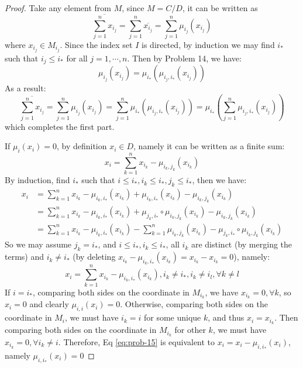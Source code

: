 \documentclass{solution}
\begin{document}
\begin{proof}
    Take any element from $M$, since $M = C/D$, it can be written as
    $$\overline{\sum\limits_{j = 1}^{n} x_{i_j}} = \sum\limits_{j = 1}^{n} \overline{x_{i_j}} = \sum\limits_{j = 1}^{n} \mu_{i_j}(x_{i_j})$$
    where $x_{i_j} \in M_{i_j}$. Since the index set $I$ is directed, by induction we may find $i_{*}$ such that $i_{j} \le i_*$ for all $j = 1, \cdots, n$. Then by Problem 14, we have:
    $$\mu_{i_j}(x_{i_j}) = \mu_{i_*}(\mu_{i_j, i_*}(x_{i_j}))$$
    As a result:
    $$\overline{\sum\limits_{j = 1}^{n} x_{i_j}} = \sum\limits_{j = 1}^{n} \mu_{i_j}(x_{i_j}) = \sum\limits_{j = 1}^{n} \mu_{i_*}(\mu_{i_j, i_*}(x_{i_j})) = \mu_{i_*} \left(\sum\limits_{j = 1}^{n} \mu_{i_j, i_*}(x_{i_j})\right)$$
    which completes the first part.

    If $\mu_i(x_i) = 0$, by definition $x_i \in D$, namely it can be written as a finite sum:
    $$x_i = \sum\limits_{k = 1}^{n} x_{i_k} - \mu_{i_k, j_k}(x_{i_k})$$
    By induction, find $i_*$ such that $i \le i_*, i_k \le i_*, j_k \le i_*$, then we have:
    $$
        \begin{aligned}
        x_i &= \sum\limits_{k = 1}^{n} x_{i_k} - \mu_{i_k, i_*}(x_{i_k}) + \mu_{i_k, i_*}(x_{i_k}) - \mu_{i_k, j_k}(x_{i_k}) \\
        &= \sum\limits_{k = 1}^{n} x_{i_k} - \mu_{i_k, i_*}(x_{i_k}) + \mu_{j_k, i_*} \circ \mu_{i_k, j_k} (x_{i_k}) - \mu_{i_k, j_k}(x_{i_k})\\
        &= \sum\limits_{k = 1}^{n} x_{i_k} - \mu_{i_k, i_*}(x_{i_k}) - \sum\limits_{k = 1}^{n} \mu_{i_k, j_k}(x_{i_k}) - \mu_{j_k, i_*} \circ \mu_{i_k, j_k} (x_{i_k})
        \end{aligned}
    $$
    So we may assume $j_k = i_*$, and $i \le i_*, i_k \le i_*$, all $i_k$ are distinct (by merging the terms) and $i_k \ne i_*$ (by deleting $x_{i_k} - \mu_{i_k, i_*}(x_{i_k}) = x_{i_k} - x_{i_k} = 0$), namely:
    \begin{equation}\label{eq:prob-15}
        x_i = \sum\limits_{k = 1}^{n} x_{i_k} - \mu_{i_k, i_*}(x_{i_k}), i_k \ne i_*, i_k \ne i_l, \forall k \ne l
    \end{equation}
    If $i = i_*$, comparing both sides on the coordinate in $M_{i_k}$, we have $x_{i_k} = 0, \forall k$, so $x_i = 0$ and clearly $\mu_{i, i}(x_{i}) = 0$. Otherwise, comparing both sides on the coordinate in $M_{i}$, we must have $i_k = i$ for some unique $k$, and thus $x_i = x_{i_k}$. Then comparing both sides on the coordinate in $M_{i_k}$ for other $k$, we must have $x_{i_k} = 0, \forall i_k \ne i$. Therefore, Eq \ref{eq:prob-15} is equivalent to $x_i = x_i - \mu_{i, i_*}(x_{i})$, namely $\mu_{i, i_*}(x_i) = 0$
\end{proof}
\end{document}
